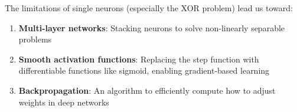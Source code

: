 \begin{bluebox}
The limitations of single neurons (especially the XOR problem) lead us toward:
\begin{enumerate}
    \item \textbf{Multi-layer networks}: Stacking neurons to solve non-linearly separable problems
    \item \textbf{Smooth activation functions}: Replacing the step function with differentiable functions like sigmoid, enabling gradient-based learning
    \item \textbf{Backpropagation}: An algorithm to efficiently compute how to adjust weights in deep networks
\end{enumerate}
\end{bluebox}

